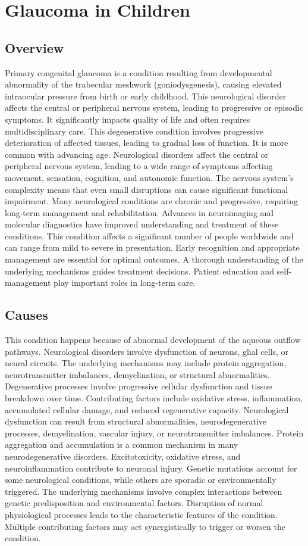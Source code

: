 \chapter{Glaucoma in Children}
\label{sec:Glaucoma in Children}

\section{Overview}
Primary congenital glaucoma is a condition resulting from developmental abnormality of the trabecular meshwork (goniodysgenesis), causing elevated intraocular pressure from birth or early childhood. This neurological disorder affects the central or peripheral nervous system, leading to progressive or episodic symptoms. It significantly impacts quality of life and often requires multidisciplinary care. This degenerative condition involves progressive deterioration of affected tissues, leading to gradual loss of function. It is more common with advancing age. Neurological disorders affect the central or peripheral nervous system, leading to a wide range of symptoms affecting movement, sensation, cognition, and autonomic function. The nervous system's complexity means that even small disruptions can cause significant functional impairment. Many neurological conditions are chronic and progressive, requiring long-term management and rehabilitation. Advances in neuroimaging and molecular diagnostics have improved understanding and treatment of these conditions. This condition affects a significant number of people worldwide and can range from mild to severe in presentation. Early recognition and appropriate management are essential for optimal outcomes. A thorough understanding of the underlying mechanisms guides treatment decisions. Patient education and self-management play important roles in long-term care.
\section{Causes}
This condition happens because of abnormal development of the aqueous outflow pathways. Neurological disorders involve dysfunction of neurons, glial cells, or neural circuits. The underlying mechanisms may include protein aggregation, neurotransmitter imbalances, demyelination, or structural abnormalities. Degenerative processes involve progressive cellular dysfunction and tissue breakdown over time. Contributing factors include oxidative stress, inflammation, accumulated cellular damage, and reduced regenerative capacity. Neurological dysfunction can result from structural abnormalities, neurodegenerative processes, demyelination, vascular injury, or neurotransmitter imbalances. Protein aggregation and accumulation is a common mechanism in many neurodegenerative disorders. Excitotoxicity, oxidative stress, and neuroinflammation contribute to neuronal injury. Genetic mutations account for some neurological conditions, while others are sporadic or environmentally triggered. The underlying mechanisms involve complex interactions between genetic predisposition and environmental factors. Disruption of normal physiological processes leads to the characteristic features of the condition. Multiple contributing factors may act synergistically to trigger or worsen the condition.
